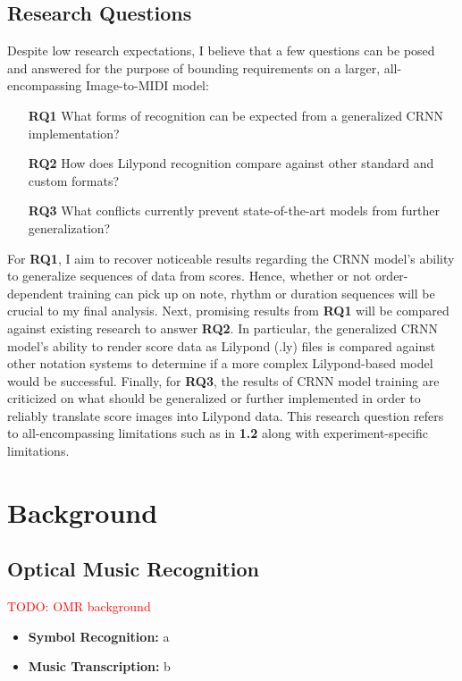 \documentclass[review,sigconf]{acmart}
\newcommand{\todo}[1]{\textcolor{red}{TODO: #1}}
\begin{document}
\subsection{Research Questions}

Despite low research expectations, I believe that a few questions can be posed and answered for the purpose of bounding requirements on a larger, all-encompassing Image-to-MIDI model:

\begin{itemize}
	\item [\textbf{RQ1}] What forms of recognition can be expected from a generalized CRNN implementation?
	\item [\textbf{RQ2}] How does Lilypond recognition compare against other standard and custom formats?
	\item [\textbf{RQ3}] What conflicts currently prevent state-of-the-art models from further generalization?
\end{itemize}

For \textbf{RQ1}, I aim to recover noticeable results regarding the CRNN model's ability to generalize sequences of data from scores.
Hence, whether or not order-dependent training can pick up on note, rhythm or duration sequences will be crucial to my final analysis.
Next, promising results from \textbf{RQ1} will be compared against existing research to answer \textbf{RQ2}. 
In particular, the generalized CRNN model's ability to render score data as Lilypond (.ly) files is compared against other notation systems to determine if a more complex Lilypond-based model would be successful.
Finally, for \textbf{RQ3}, the results of CRNN model training are criticized on what should be generalized or further implemented in order to reliably translate score images into Lilypond data.
This research question refers to all-encompassing limitations such as in \textbf{1.2} along with experiment-specific limitations.

\section{Background}
\subsection{Optical Music Recognition}
\todo{OMR background}

\begin{itemize}
	\item \textbf{Symbol Recognition:} a
	\item \textbf{Music Transcription:} b
\end{itemize}
\end{document}
